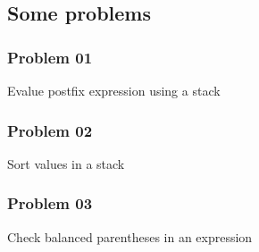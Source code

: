 \subsection{Some problems}
\subsubsection{Problem 01}
\textsf{Evalue postfix expression using a stack}


\subsubsection{Problem 02}
\textsf{Sort values in a stack}


\subsubsection{Problem 03}
\textsf{Check balanced parentheses in an expression}

